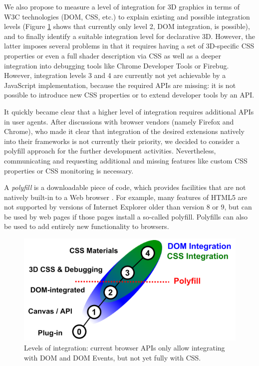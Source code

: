 \documentclass{acmsiggraph}
\begin{document}
We also propose to measure a level of integration for 3D graphics in terms of W3C technologies (DOM, CSS, etc.) to explain existing and possible integration levels (Figure \ref{fig:polyInt} shows that currently only level 2, DOM integration, is possible), and to finally identify a suitable integration level for declarative 3D. However, the latter imposes several problems in that it requires having a set of 3D-specific CSS properties or even a full shader description via CSS as well as a deeper integration into debugging tools like Chrome Developer Tools or Firebug. However, integration levels 3 and 4 are currently not yet achievable by a JavaScript implementation, because the required APIs are missing: it is not possible to introduce new CSS properties or to extend developer tools by an API.

It quickly became clear that a higher level of integration requires additional APIs in user agents. After discussions with browser vendors (namely Firefox and Chrome), who made it clear that integration of the desired extensions natively into their frameworks is not currently their priority, we decided to consider a polyfill approach for the further development activities.
Nevertheless, communicating and requesting additional and missing features like custom CSS properties or CSS monitoring is necessary.

A \textit{polyfill} is a downloadable piece of code, which provides facilities that are not natively built-in to a Web browser \cite{Sharp2010}. For example, many features of HTML5 are not supported by versions of Internet Explorer older than version 8 or 9, but can be used by web pages if those pages install a so-called polyfill. Polyfills can also be used to add entirely new functionality to browsers.

\begin{figure}
  \centering
  \includegraphics[width=0.85\columnwidth]{images/polyfill.png}
  \caption{Levels of integration: current browser APIs only allow integrating with DOM and DOM Events, but not yet fully with CSS.}
  \label{fig:polyInt}
\end{figure}
\end{document}

